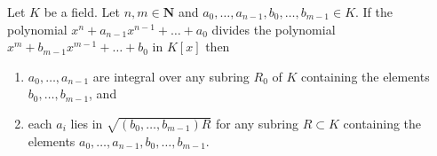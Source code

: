 \begin{lemma}
\label{lemma-polynomials-divide}
Let $K$ be a field. Let $n, m \in \mathbf{N}$ and
$a_0, \ldots, a_{n - 1}, b_0, \ldots, b_{m - 1} \in K$.
If the polynomial $x^n + a_{n - 1}x^{n - 1} + \ldots + a_0$
divides the polynomial $x^m + b_{m - 1} x^{m - 1} + \ldots + b_0$
in $K[x]$ then
\begin{enumerate}
\item $a_0, \ldots, a_{n - 1}$ are integral over any subring
$R_0$ of $K$ containing the elements $b_0, \ldots, b_{m - 1}$, and
\item each $a_i$ lies in $\sqrt{(b_0, \ldots, b_{m-1})R}$
for any subring $R \subset K$ containing the elements
$a_0, \ldots, a_{n - 1}, b_0, \ldots, b_{m - 1}$.
\end{enumerate}
\end{lemma}

